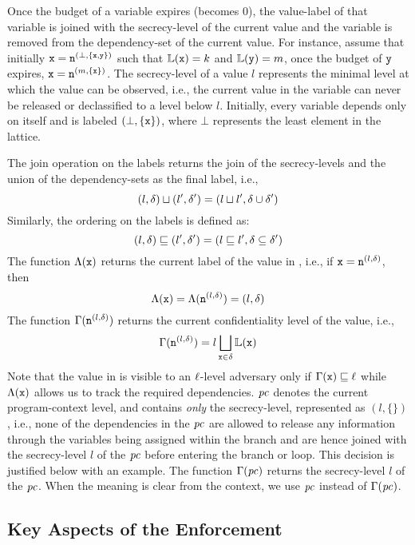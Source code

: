 Once the budget of a variable expires (becomes $0$), the value-label of that
variable is joined with the secrecy-level of the current value and
the variable is removed from the dependency-set of the current value. 
For instance, assume that initially $\texttt{x} = \texttt{n}^{(\bot, \{\texttt{x}, \texttt{y}\})}$ 
such that $\mathbb{L}(\texttt{x}) = k$ and $\mathbb{L}(\texttt{y}) = m$, once the budget of
$\texttt{y}$ expires, $\texttt{x} = \texttt{n}^{(m, \{\texttt{x}\})}$. The
secrecy-level of a value $l$ represents the minimal level at which the
value can be observed, i.e., the current value in the variable can never 
be released or declassified to a level below $l$. Initially, every
variable  depends only on itself and is labeled 
$(\bot, \{\texttt{x}\})$, where $\bot$ represents the least
element in the lattice. 

The join operation on the labels returns the join of the
secrecy-levels and the union of the dependency-sets as the final
label, i.e., 
$$(l, \delta) \sqcup (l', \delta') = (l \sqcup l', \delta \cup \delta')$$
Similarly, the ordering on the labels is defined as:
$$(l, \delta) \sqsubseteq (l', \delta') = (l \sqsubseteq l', \delta \subseteq \delta')$$
The function $\Lambda(\texttt{x})$ returns the current label of the value
in , i.e., if $\texttt{x} = \texttt{n}^{(l, \delta)}$, then
$$\Lambda(\texttt{x}) = \Lambda(\texttt{n}^{(l, \delta)}) = {(l, \delta)}$$ 
The function $\Gamma(\texttt{n}^{(l, \delta)})$ returns the current
confidentiality level of the value, i.e., 
$$\Gamma(\texttt{n}^{(l, \delta)}) = l \bigsqcup\limits_{\texttt{x} \in
	\delta} \mathbb{L}(\texttt{x})$$ 
Note that the value in  is visible to an $\ell$-level
adversary only if $\Gamma(\texttt{x}) \sqsubseteq \ell$ while
$\Lambda(\texttt{x})$ allows us to track the required dependencies. 
$\mathit{pc}$ denotes the current program-context level, and 
contains \emph{only} the secrecy-level, represented as $(l, \{\})$,
i.e., none of the dependencies in the $\mathit{pc}$ are allowed to release any
information through the variables being assigned within the branch and
are hence joined with the secrecy-level $l$ of the $\mathit{pc}$ before
entering the branch or loop. This decision is justified below with an
example. The function $\Gamma(\mathit{pc})$ returns the secrecy-level $l$ of
the $\mathit{pc}$. When the meaning is clear from the context, we use $\mathit{pc}$ 
instead of $\Gamma(\mathit{pc})$.  

\subsection{Key Aspects of the Enforcement}
\label{sec:enf-design}


